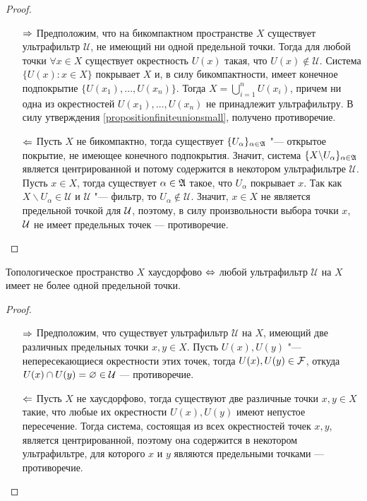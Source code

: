 \begin{proof}~
    \begin{itemize}
        \item[$\Rightarrow$] Предположим, что на бикомпактном пространстве $X$ существует ультрафильтр $\mathcal{U}$, не имеющий ни  одной предельной точки. Тогда для любой точки $\forall x\in X$ существует окрестность $U(x)$ такая, что $U(x)\notin\mathcal{U}$. Система $\{U(x): {x \in X}\}$ покрывает $X$ и, в силу бикомпактности, имеет конечное подпокрытие $\{U(x_1), \dotsc, U(x_n)\}$. Тогда $X = \bigcup_{i = 1}^n U(x_i)$, причем ни одна из окрестностей $U(x_1), \dotsc, U(x_n)$ не принадлежит ультрафильтру. В силу утверждения \ref{propositionfiniteunionsmall}, получено противоречие.

        \item[$\Leftarrow$] Пусть $X$ не бикомпактно, тогда существует $\lbrace U_{\alpha}\rbrace_{\alpha \in \mathfrak A}$ "--- открытое покрытие, не имеющее конечного подпокрытия. Значит, система $\lbrace X\backslash U_{\alpha}\rbrace_{\alpha \in \mathfrak A}$ является центрированной и потому содержится в некотором ультрафильтре $\mathcal{U}$. Пусть $x \in X$, тогда существует $\alpha \in \mathfrak A$ такое, что $U_{\alpha}$ покрывает $x$. Так как $X\backslash U_{\alpha}\in\mathcal{U}$ и $\mathcal{U}$ "--- фильтр, то
        $U_{\alpha} \notin \mathcal{U}$. Значит, $x \in X$ не является предельной точкой для $\mathcal U$, поэтому, в силу произвольности выбора точки $x$, $\mathcal U$ не имеет предельных точек --- противоречие.\qedhere
    \end{itemize}
\end{proof}

\begin{proposition}
    Топологическое пространство $X$ хаусдорфово $\Leftrightarrow$ любой ультрафильтр $\mathcal{U}$ на $X$ имеет не более одной предельной точки.
\end{proposition}

\begin{proof}~
    \begin{itemize}
        \item[$\Rightarrow$] Предположим, что существует ультрафильтр $\mathcal{U}$ на $X$, имеющий две различных предельных точки $x, y \in X$. Пусть $U(x), U(y)$ "--- непересекающиеся окрестности этих точек, тогда $U(x), U(y) \in \mathcal F$, откуда $U(x) \cap U(y) = \varnothing \in \mathcal U$ --- противоречие.
        
        \item[$\Leftarrow$] Пусть $X$ не хаусдорфово, тогда существуют две различные точки $x, y \in X$ такие, что любые их окрестности $U(x), U(y)$ имеют непустое пересечение. Тогда система, состоящая из всех окрестностей точек $x, y$, является центрированной, поэтому она содержится в некотором ультрафильтре, для которого $x$ и $y$ являются предельными точками --- противоречие.\qedhere
    \end{itemize}
\end{proof}

